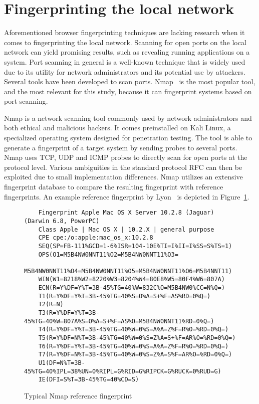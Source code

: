 \section{Fingerprinting the local network}
Aforementioned browser fingerprinting techniques are lacking research when it comes to fingerprinting the local network. Scanning for open ports on the local network can yield promising results, such as revealing running applications on a system.
Port scanning in general is a well-known technique that is widely used due to its utility for network administrators and its potential use by attackers.
Several tools have been developed to scan ports. Nmap~ is the most popular tool, and the most relevant for this study, because it can fingerprint systems based on port scanning. 

Nmap is a network scanning tool commonly used by network administrators and both ethical and malicious hackers. It comes preinstalled on Kali Linux, a specialized operating system designed for penetration testing. The tool is able to generate a fingerprint of a target system by sending probes to several ports. Nmap uses TCP, UDP and ICMP probes to directly scan for open ports at the protocol level. Various ambiguities in the standard protocol RFC can
then be exploited due to small implementation differences.
Nmap utilizes an extensive fingerprint database to compare the resulting fingerprint with reference fingerprints. 
An example reference fingerprint by Lyon~ is depicted in Figure~\ref{fig:nmap-fingerprint}. 

\begin{figure}[H]
    \begin{verbatim}
    Fingerprint Apple Mac OS X Server 10.2.8 (Jaguar) (Darwin 6.8, PowerPC)
    Class Apple | Mac OS X | 10.2.X | general purpose
    CPE cpe:/o:apple:mac_os_x:10.2.8
    SEQ(SP=FB-111%GCD=1-6%ISR=104-10E%TI=I%II=I%SS=S%TS=1)
    OPS(O1=M5B4NW0NNT11%O2=M5B4NW0NNT11%O3=
    M5B4NW0NNT11%O4=M5B4NW0NNT11%O5=M5B4NW0NNT11%O6=M5B4NNT11)
    WIN(W1=8218%W2=8220%W3=8204%W4=80E8%W5=80F4%W6=807A)
    ECN(R=Y%DF=Y%T=3B-45%TG=40%W=832C%O=M5B4NW0%CC=N%Q=)
    T1(R=Y%DF=Y%T=3B-45%TG=40%S=O%A=S+%F=AS%RD=0%Q=)
    T2(R=N)
    T3(R=Y%DF=Y%T=3B-45%TG=40%W=807A%S=O%A=S+%F=AS%O=M5B4NW0NNT11%RD=0%Q=)
    T4(R=Y%DF=Y%T=3B-45%TG=40%W=0%S=A%A=Z%F=R%O=%RD=0%Q=)
    T5(R=Y%DF=N%T=3B-45%TG=40%W=0%S=Z%A=S+%F=AR%O=%RD=0%Q=)
    T6(R=Y%DF=Y%T=3B-45%TG=40%W=0%S=A%A=Z%F=R%O=%RD=0%Q=)
    T7(R=Y%DF=N%T=3B-45%TG=40%W=0%S=Z%A=S%F=AR%O=%RD=0%Q=)
    U1(DF=N%T=3B-45%TG=40%IPL=38%UN=0%RIPL=G%RID=G%RIPCK=G%RUCK=0%RUD=G)
    IE(DFI=S%T=3B-45%TG=40%CD=S)
    \end{verbatim}
    \caption{Typical Nmap reference fingerprint}
    \label{fig:nmap-fingerprint}
\end{figure}

